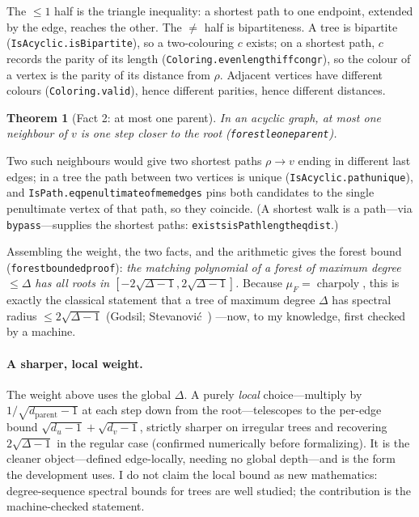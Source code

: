 \documentclass[11pt]{article}
\newtheorem{theorem}{Theorem}
\newcommand{\lean}[1]{{\def\_{\textunderscore\allowbreak}\texttt{#1}}}
\begin{document}
The $\le1$ half is the triangle inequality: a shortest path to one endpoint,
extended by the edge, reaches the other. The $\ne$ half is bipartiteness. A tree
is bipartite (\lean{IsAcyclic.isBipartite}), so a two-colouring $c$ exists; on a
shortest path, $c$ records the parity of its length
(\lean{Coloring.even\_length\_iff\_congr}), so the colour of a vertex is the parity
of its distance from $\rho$. Adjacent vertices have different colours
(\lean{Coloring.valid}), hence different parities, hence different distances.

\begin{theorem}[Fact 2: at most one parent]
\label{thm:f2}
In an acyclic graph, at most one neighbour of $v$ is one step closer to the root
(\lean{forest\_le\_one\_parent}).
\end{theorem}

Two such neighbours would give two shortest paths $\rho\to v$ ending in different
last edges; in a tree the path between two vertices is unique
(\lean{IsAcyclic.path\_unique}), and \lean{IsPath.eq\_penultimate\_of\_mem\_edges}
pins both candidates to the single penultimate vertex of that path, so they
coincide. (A shortest walk is a path---via \lean{bypass}---supplies the shortest
paths: \lean{exists\_isPath\_length\_eq\_dist}.)

Assembling the weight, the two facts, and the arithmetic gives the forest bound
(\lean{forest\_bounded\_proof}): \emph{the matching polynomial of a forest of
maximum degree $\le\Delta$ has all roots in
$[-2\sqrt{\Delta-1},2\sqrt{\Delta-1}]$.} Because $\mu_F=\operatorname{charpoly}$,
this is exactly the classical statement that a tree of maximum degree $\Delta$ has
spectral radius $\le2\sqrt{\Delta-1}$ (Godsil; Stevanovi\'c~\cite{Stevanovic2003})
---now, to my knowledge, first checked by a machine.

\paragraph{A sharper, local weight.} The weight above uses the global $\Delta$. A
purely \emph{local} choice---multiply by $1/\sqrt{d_{\text{parent}}-1}$ at each
step down from the root---telescopes to the per-edge bound
$\sqrt{d_u-1}+\sqrt{d_v-1}$, strictly sharper on irregular trees and recovering
$2\sqrt{\Delta-1}$ in the regular case (confirmed numerically before formalizing).
It is the cleaner object---defined edge-locally, needing no global depth---and is
the form the development uses. I do not claim the local bound as new mathematics:
degree-sequence spectral bounds for trees are well studied; the contribution is
the machine-checked statement.
\end{document}
